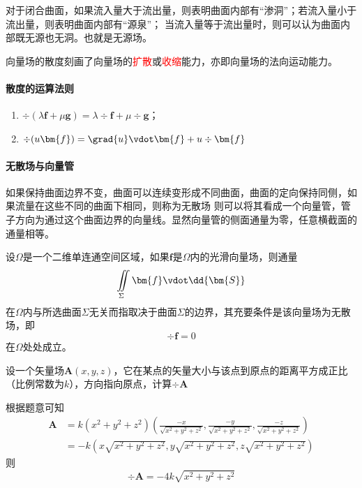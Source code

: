 对于闭合曲面，如果流入量大于流出量，则表明曲面内部有“渗洞”；若流入量小于流出量，则表明曲面内部有“源泉”；
当流入量等于流出量时，则可以认为曲面内部既无源也无洞。也就是无源场。

向量场的散度刻画了向量场的\textcolor{red}{扩散}或\textcolor{red}{收缩}能力，亦即向量场的法向运动能力。

\paragraph{散度的运算法则}
\begin{enumerate}[(1)]
    \item $\div(\lambda\bm{f}+\mu\bm{g})=\lambda\div{\bm{f}} + \mu\div{\bm{g}}$；
    \item $\div(u\bm{f})=\grad{u}\vdot\bm{f} + u\div{\bm{f}}$
\end{enumerate}

\paragraph{无散场与向量管}
如果保持曲面边界不变，曲面可以连续变形成不同曲面，曲面的定向保持同侧，如果流量在这些不同的曲面下相同，则称为无散场
则可以将其看成一个向量管，管子方向为通过这个曲面边界的向量线。显然向量管的侧面通量为零，任意横截面的通量相等。

\begin{theorem}
    设$\Omega$是一个二维单连通空间区域，如果$\bm{f}$是$\Omega$内的光滑向量场，则通量
    \[ \iint\limits_\Sigma \bm{f}\vdot\dd{\bm{S}} \]
    在$\Omega$内与所选曲面$\Sigma$无关而指取决于曲面$\Sigma$的边界，其充要条件是该向量场为无散场，即
    \[ \div{\bm{f}} = 0 \]
    在$\Omega$处处成立。
\end{theorem}

\begin{example}
    设一个矢量场$\bm{A}(x,y,z)$，它在某点的矢量大小与该点到原点的距离平方成正比（比例常数为$k$），方向指向原点，计算$\div{\bm{A}}$
\end{example}
\begin{solution}
    根据题意可知
    \begin{align*}
        \bm{A} & =k(x^2+y^2+z^2)(\frac{-x}{\sqrt{x^2+y^2+z^2}},\frac{-y}{\sqrt{x^2+y^2+z^2}},\frac{-z}{\sqrt{x^2+y^2+z^2}}) \\
               & = -k(x\sqrt{x^2+y^2+z^2},y\sqrt{x^2+y^2+z^2},z\sqrt{x^2+y^2+z^2})
    \end{align*}
    则
    \[ \div{\bm{A}} = -4k\sqrt{x^2+y^2+z^2} \]
\end{solution}

